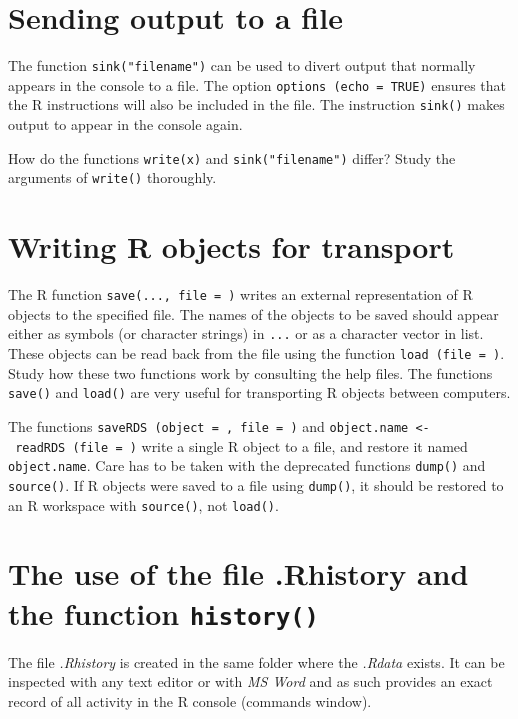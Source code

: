 \documentclass[
]{book}
\begin{document}
\section{Sending output to a file}\label{sending-output-to-a-file}

The function \texttt{sink("filename")} can be used to divert output that normally appears in the console to a file. The option \texttt{options\ (echo\ =\ TRUE)} ensures that the R instructions will also be included in the file. The instruction \texttt{sink()} makes output to appear in the console again.

How do the functions \texttt{write(x)} and \texttt{sink("filename")} differ? Study the arguments of \texttt{write()} thoroughly.

\section{Writing R objects for transport}\label{writing-r-objects-for-transport}

The R function \texttt{save(...,\ file\ =\ )} writes an external representation of R objects to the specified file. The names of the objects to be saved should appear either as symbols (or character strings) in \texttt{...} or as a character vector in list. These objects can be read back from the file using the function \texttt{load\ (file\ =\ )}. Study how these two functions work by consulting the help files. The functions \texttt{save()} and \texttt{load()} are very useful for transporting R objects between computers.

The functions \texttt{saveRDS\ (object\ =\ ,\ file\ =\ )} and \texttt{object.name\ \textless{}-\ readRDS\ (file\ =\ )} write a single R object to a file, and restore it named \texttt{object.name}. Care has to be taken with the deprecated functions \texttt{dump()} and \texttt{source()}. If R objects were saved to a file using \texttt{dump()}, it should be restored to an R workspace with \texttt{source()}, not \texttt{load()}.

\section{\texorpdfstring{The use of the file .Rhistory and the function \texttt{history()}}{The use of the file .Rhistory and the function history()}}\label{the-use-of-the-file-.rhistory-and-the-function-history}

The file \emph{{.Rhistory}} is created in the same folder where the \emph{{.Rdata}} exists. It can be inspected with any text editor or with \emph{{MS Word}} and as such provides an exact record of all activity in the R console (commands window).
\end{document}
